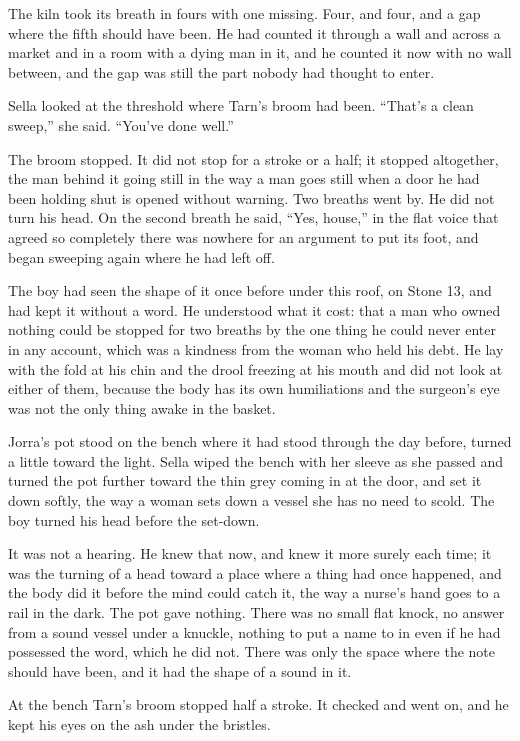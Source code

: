 The kiln took its breath in fours with one missing. Four, and four, and a gap where the fifth should have been. He had counted it through a wall and across a market and in a room with a dying man in it, and he counted it now with no wall between, and the gap was still the part nobody had thought to enter.

Sella looked at the threshold where Tarn's broom had been. “That's a clean sweep,” she said. “You've done well.”

The broom stopped. It did not stop for a stroke or a half; it stopped altogether, the man behind it going still in the way a man goes still when a door he had been holding shut is opened without warning. Two breaths went by. He did not turn his head. On the second breath he said, “Yes, house,” in the flat voice that agreed so completely there was nowhere for an argument to put its foot, and began sweeping again where he had left off.

The boy had seen the shape of it once before under this roof, on Stone 13, and had kept it without a word. He understood what it cost: that a man who owned nothing could be stopped for two breaths by the one thing he could never enter in any account, which was a kindness from the woman who held his debt. He lay with the fold at his chin and the drool freezing at his mouth and did not look at either of them, because the body has its own humiliations and the surgeon's eye was not the only thing awake in the basket.

Jorra's pot stood on the bench where it had stood through the day before, turned a little toward the light. Sella wiped the bench with her sleeve as she passed and turned the pot further toward the thin grey coming in at the door, and set it down softly, the way a woman sets down a vessel she has no need to scold. The boy turned his head before the set-down.

It was not a hearing. He knew that now, and knew it more surely each time; it was the turning of a head toward a place where a thing had once happened, and the body did it before the mind could catch it, the way a nurse's hand goes to a rail in the dark. The pot gave nothing. There was no small flat knock, no answer from a sound vessel under a knuckle, nothing to put a name to in  even if he had possessed the word, which he did not. There was only the space where the note should have been, and it had the shape of a sound in it.

At the bench Tarn's broom stopped half a stroke. It checked and went on, and he kept his eyes on the ash under the bristles.

